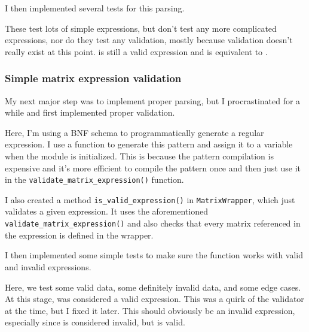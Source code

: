 \documentclass[../development.tex]{subfiles}
\begin{document}
I then implemented several tests for this parsing.


These test lots of simple expressions, but don't test any more complicated expressions, nor do they test any validation, mostly because validation doesn't really exist at this point.  is still a valid expression and is equivalent to .

\subsubsection{Simple matrix expression validation\label{development:matrices-backend:simple-matrix-expression-validation}}

My next major step was to implement proper parsing, but I procrastinated for a while and first implemented proper validation.


Here, I'm using a BNF schema to programmatically generate a regular expression. I use a function to generate this pattern and assign it to a variable when the module is initialized. This is because the pattern compilation is expensive and it's more efficient to compile the pattern once and then just use it in the \texttt{validate\_matrix\_expression()} function.

I also created a method \texttt{is\_valid\_expression()} in \texttt{MatrixWrapper}, which just validates a given expression. It uses the aforementioned \texttt{validate\_matrix\_expression()} and also checks that every matrix referenced in the expression is defined in the wrapper.


I then implemented some simple tests to make sure the function works with valid and invalid expressions.


Here, we test some valid data, some definitely invalid data, and some edge cases. At this stage,  was considered a valid expression. This was a quirk of the validator at the time, but I fixed it later. This should obviously be an invalid expression, especially since  is considered invalid, but  is valid.
\end{document}
